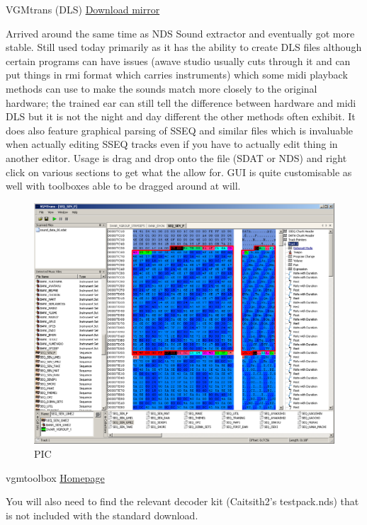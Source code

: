 \documentclass[
]{book}
\begin{document}
VGMtrans (DLS) \href{http://filetrip.net/nds-downloads/utilities/download-vgmtrans-92909-f27960.html}{Download mirror}

Arrived around the same time as NDS Sound extractor and eventually got more stable. Still used today primarily as it has the ability to create DLS files although certain programs can have issues (awave studio usually cuts through it and can put things in rmi format which carries instruments) which some midi playback methods can use to make the sounds match more closely to the original hardware; the trained ear can still tell the difference between hardware and midi DLS but it is not the night and day different the other methods often exhibit. It does also feature graphical parsing of SSEQ and similar files which is invaluable when actually editing SSEQ tracks even if you have to actually edit thing in another editor. Usage is drag and drop onto the file (SDAT or NDS) and right click on various sections to get what the allow for. GUI is quite customisable as well with toolboxes able to be dragged around at will.

\begin{figure}
\centering
\includegraphics{images/136_home_fast6191_romhackingguide_unrenamed_files_and_original_borders_romhackguidevgmtrans.png}
\caption{PIC}
\end{figure}

vgmtoolbox \href{http://sourceforge.net/projects/vgmtoolbox/files/vgmtoolbox/}{Homepage}

You will also need to find the relevant decoder kit (Caitsith2's testpack.nds) that is not included with the standard download.
\end{document}
